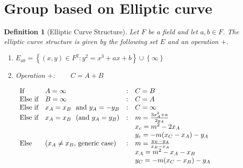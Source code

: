 \documentclass{article}%
\newtheorem{definition}[theorem]{Definition}
\begin{document}
\section{Group based on Elliptic curve}

\begin{definition}
[Elliptic Curve Structure]Let $F$ be a field and let $a,b\in F$. The elliptic
curve structure is given by the following set $E$ and an operation $+$.

\begin{enumerate}
\item $E_{ab}=\left\{  \left(  x,y\right)  \in F^{2}:y^{2}=x^{3}+ax+b\right\}
\cup\left\{  \infty\right\}  $

\item Operation \thinspace$+$:\ \ \ \ $\ C=A+B$

$%
\begin{array}
[b]{llll}%
\text{If} & A=\infty & \text{:} & C=B\\
\text{Else\ if} & B=\infty & \text{:} & C=A\\
\text{Else\ if} & x_{A}=x_{B}\ \ \text{and }y_{A}=-y_{B} & \text{:} &
C=\infty\\
\text{Else\ if} & x_{A}=x_{B}\ \ \text{(and }y_{A}=y_{B}\text{)} & \text{:} & m = \frac{3x_A^2+a}{2y_A}\\
& & & x_c = m^2-2x_A\\
& & & y_c = -m(x_C-x_A)-y_A\\
\text{Else} & \text{(}x_{A}\neq x_{B}\text{,\ generic case)} & \text{:} &
m = \frac{y_B - y_A}{x_B - x_A}\\
& & & x_A = m^2-x_A-x_B\\
& & & y_C = -m(x_C - x_B)-y_A\\
\end{array}
$
\end{enumerate}
\end{definition}
\end{document}
